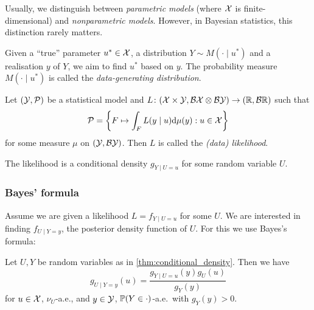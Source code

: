 Usually, we distinguish between \emph{parametric models} (where $\mathcal X$ is finite-dimensional) and \emph{nonparametric models}. However, in Bayesian statistics, this distinction rarely matters.

Given a ``true'' parameter $u^* \in \mathcal X$, a distribution $Y \sim M(\cdot \mid u^*)$ and a realisation $y$ of $Y$, we aim to find $u^*$ based on $y$. The probability measure $M(\cdot \mid u^*)$ is called the \emph{data-generating distribution}. 

\begin{definition}
	Let $(\mathcal Y, \mathcal P)$ be a statistical model and $L \colon (\mathcal X \times \mathcal Y, \mathcal B\mathcal X \otimes \mathcal B\mathcal Y) \to (\mathbb R, \mathcal B\mathbb R)$ such that
	\[
	\mathcal P = \qty{F \mapsto \int_F L(y \mid u) \dd\mu(y) : u \in \mathcal X}
	\]
	for some measure $\mu$ on $(\mathcal Y, \mathcal B\mathcal Y)$. Then $L$ is called the \emph{(data) likelihood}. 
\end{definition}
The likelihood is a conditional density $g_{Y\mid U = u}$ for some random variable $U$. 

\subsubsection{Bayes' formula}
Assume we are given a likelihood $L = f_{Y \mid U = u}$ for some $U$. We are interested in finding $f_{U \mid Y = y}$, the posterior density function of $U$. For this we use Bayes's formula:
\begin{theorem}[Bayes]
	Let $U, Y$ be random variables as in \cref{thm:conditional_density}. Then we have
	\[
	g_{U \mid Y =y}(u) = \frac{g_{Y \mid U = u}(y) g_{U}(u)}{g_Y(y)}
	\]
	for $u \in \mathcal X$, $\nu_U$-a.e., and $y \in \mathcal Y$, $\mathbb P(Y \in \cdot)$-a.e.\ with $g_Y(y) > 0$. 
\end{theorem}